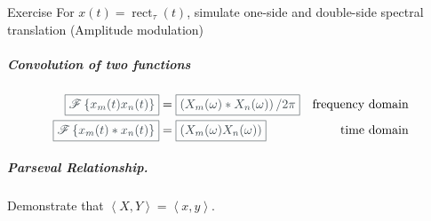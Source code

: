 \documentclass[17pt,a4paper]{extarticle}
\newcommand{\cita}[1]{\textcolor[rgb]{0.23, 0.27, 0.29}{\boxed{{\Large #1}}}}
\newcommand{\labelpethau}[1]{\texttt{#1}:}
\newlength\normalparindent
\newenvironment{pethau}%
{\begin{list}{}%
		{\renewcommand{\makelabel}{\labelpethau}%
			\setlength{\itemindent}{0pt}%
			\setlength{\leftmargin}{0pt}%
			\setlength{\labelwidth}{-1\normalparindent}%
			\addtolength{\topsep}{-0.5\parskip}%
			\listparindent \normalparindent
			\setlength{\parsep}{\parskip}}}%
	{\end{list}}
\begin{document}
\begin{pethau}
	\item[Exercise]For $x(t)=\operatorname{rect}_{\tau}(t)$, simulate one-side and double-side spectral translation (Amplitude modulation)
\end{pethau}

\subparagraph{\textit{Convolution of two functions}}
\begin{linenomath*}\begin{align*}
\cita{\mathscr{F}\left\{ x_{m}(t)x_{n}(t)\right\}} &=\cita{\left(
	X_{m}(\omega)\ast X_{n}(\omega)\right)/ {2\pi}}&\textrm{frequency domain}	 \\	
	\cita{\mathscr{F}\left\{ x_{m}(t)*x_{n}(t)\right\}} &= \cita{\left(
		X_{m}(\omega) X_{n}(\omega)\right)}&\textrm{time domain}
	\end{align*}\end{linenomath*}

\subparagraph{\textit{Parseval Relationship}.} Demonstrate that $\left\langle {X,Y} \right\rangle = \left\langle {x,y} \right\rangle$. 
\end{document}
